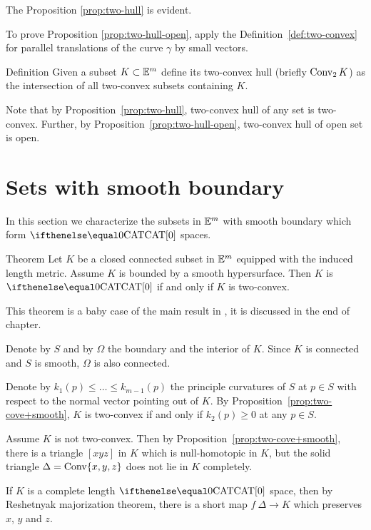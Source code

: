The Proposition \ref{prop:two-hull} is evident.

To prove Proposition \ref{prop:two-hull-open}, apply the Definition~\ref{def:two-convex} for parallel translations of the curve $\gamma$ by small vectors.
\qeds

\begin{thm}{Definition}
Given a subset $K\subset \EE^m$ define its two-convex hull (briefly $\mathop{\rm Conv}\nolimits_2K$) as the intersection of all two-convex subsets containing $K$.
\end{thm}

Note that by Proposition~\ref{prop:two-hull},
two-convex hull of any set is two-convex.
Further, 
by Proposition~\ref{prop:two-hull-open}, 
two-convex hull of open set is open.

\section{Sets with smooth boundary}\label{sec:smooth-bry}

In this section we characterize the subsets in $\mathbb{E}^m$ with smooth boundary which form $\CAT{0}$ spaces. 


\begin{thm}{Theorem}\label{thm:set-with-smooth-bry:CBA}
Let $K$ be a closed connected subset in $\mathbb{E}^m$ equipped with the induced length metric.
Assume $K$ is bounded by a smooth hypersurface.
Then 
$K$ is $\CAT0$ if and only if $K$  is two-convex.
\end{thm}

This theorem is a baby case of the main result in \cite{a-b-b:CBA-m-w-b}, it is discussed in the end of chapter. 

Denote by $S$  and by $\Omega$ the boundary and the interior of $K$. 
Since $K$ is connected and $S$ is smooth, $\Omega$ is also connected.

Denote by $k_1(p)\le\dots\le k_{m-1}(p)$ the principle curvatures of $S$ at $p\in S$ with respect to the normal vector pointing out of $K$.
By Proposition~\ref{prop:two-cove+smooth}, $K$ is two-convex if and only if $k_2(p)\ge 0$ at any $p\in S$.

Assume $K$ is not two-convex.
Then by Proposition~\ref{prop:two-cove+smooth}, there is a triangle $[xyz]$ in $K$ which is null-homotopic in $K$,
but the solid triangle $\Delta=\mathop{\rm Conv}\nolimits\{x,y,z\}$ does not lie in $K$ completely.


If $K$ is a complete length $\CAT0$ space,
then by Reshetnyak majorization theorem,
there is a short map $f\:\Delta\to K$ which preserves $x$, $y$ and $z$.

